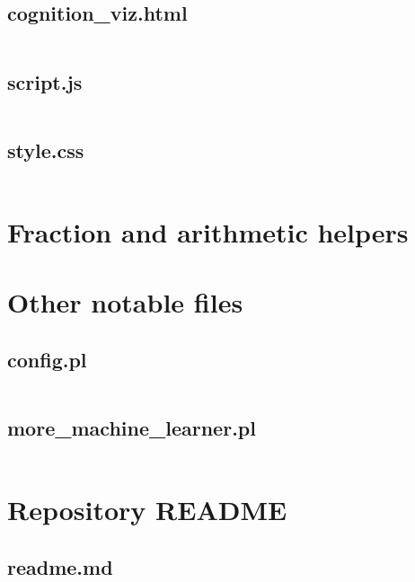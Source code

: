 \documentclass{article}
\begin{document}
\subsection{cognition\_viz.html}
\inputminted{html}{cognition_viz.html}
\subsection{script.js}
\inputminted{javascript}{script.js}
\subsection{style.css}
\inputminted{css}{style.css}

\section{Fraction and arithmetic helpers}

\section{Other notable files}
\subsection{config.pl}
\inputminted{prolog}{config.pl}
\subsection{more\_machine\_learner.pl}
\inputminted{prolog}{more_machine_learner.pl}

\section{Repository README}
\subsection{readme.md}
\inputminted{markdown}{readme.md}

\end{document}
